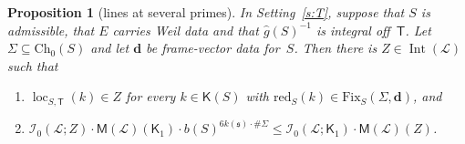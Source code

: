 \documentclass[11pt,a4paper]{article}
\newcommand{\m}[1]{\mbox{$#1$}}        %
\theoremstyle{plainx}
\newtheorem{proposition}[theorem]{Proposition}
\theoremstyle{uprightx}
\newcommand{\fs}{\mathfrak{s}}                      %
\newcommand{\sT}{\mathsf{T}}                        %
\newcommand{\cL}{\mathcal{L}}                       %
\newcommand{\kk}[1]{k(#1)}                          %
\newcommand{\bS}[1]{b(#1)}                          %
\newcommand{\ChS}[2]{\mathrm{Ch}_{#2}(#1)}          %
\newcommand{\KS}[1]{\mathsf{K}(#1)}                          %
\newcommand{\redS}[1]{\mathrm{red}_{#1}}            %
\newcommand{\gid}[1]{\hat{g}(#1)}                   %
\newcommand{\fixset}[3]{\mathrm{Fix}_{#1}(#2,#3)}   %
\newcommand{\IntG}[1]{\operatorname{Int}(#1)}       %
\newcommand{\fzf}[2]{\mathcal{I}_{0}(#1;#2)}        %
\newcommand{\loc}[2]{\operatorname{loc}_{#1,#2}}    %
\newcommand{\gM}[1]{\mathsf{M}(#1)}                 %
\begin{document}
\begin{proposition}[lines at several primes]\label{p:lines}
In Setting~\ref{s:T}, suppose that $S$ is admissible, that $E$ carries Weil data and that \m{\gid{S}^{-1}} is
integral off~$\sT$. Let \m{\Sigma\subseteq\ChS{S}{0}} and let $\mathbf d$ be frame-vector data for~$S$. Then
there is \m{Z\in\IntG{\cL}} such that
\begin{enumerate}[label=\textup{(\roman*)},leftmargin=2.3em,itemsep=1pt]
\item \m{\loc{S}{\sT}(k)\in Z} for every \m{k\in\KS{S}} with \m{\redS{S}(k)\in\fixset{S}{\Sigma}{\mathbf d}}, and
\item \m{\fzf{\cL}{Z}\cdot\gM{\cL}(\mathsf{K}_1)\cdot\bS{S}^{6\kk{\fs}\cdot\#\Sigma}\le\fzf{\cL}{\mathsf{K}_1}\cdot\gM{\cL}(Z)}.
\end{enumerate}
\end{proposition}
\end{document}
